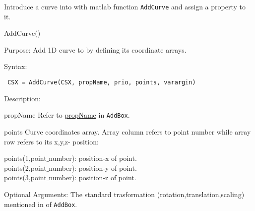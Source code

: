 Introduce a curve into \hyperref[CSX]{} with matlab function \texttt{AddCurve} and assign a property to it. 

\begin{FontNameFunct}{AddCurve()}
\end{FontNameFunct}


\begin{FontDescr}{Purpose:}
Add 1D curve to \hyperref[CSX]{} by defining its coordinate arrays.
\end{FontDescr}

\begin{FontDescr}{Syntax:}
\begin{lstlisting} 
 CSX = AddCurve(CSX, propName, prio, points, varargin)
\end{lstlisting}
\end{FontDescr}

\begin{FontDescr}{Description:}

\begin{FontPara}{propName}
Refer to \hyperref[prim_Name]{propName} in \texttt{AddBox}. 
\end{FontPara}

\begin{FontPara}{points}
 \label{points_curve}
Curve coordinates array. Array column refers to point number while array row refers to its x,y,z- position:
\begin{myindentpar}     
points(1,point$\_$number): position-x of point.\\
points(2,point$\_$number): position-y of point.\\
points(3,point$\_$number): position-z of point.
\end{myindentpar}

\end{FontPara}
\end{FontDescr}

\begin{FontDescr}{Optional Arguments:}
The standard trasformation (rotation,translation,scaling) mentioned in  \hyperref[prim_transform]{} of \texttt{AddBox}.   
\end{FontDescr}


